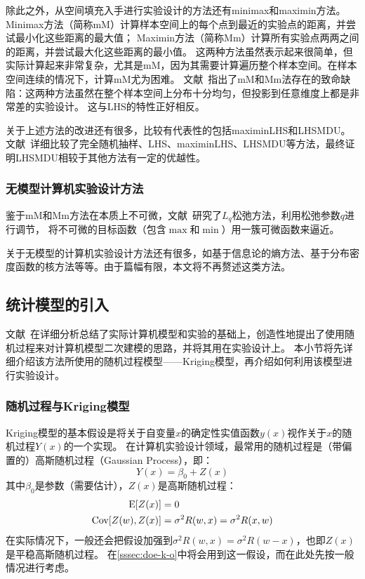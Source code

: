 \documentclass[index]{subfiles}
\begin{document}
除此之外，从空间填充入手进行实验设计的方法还有minimax和maximin方法\cite{johnson1990}。
Minimax方法（简称mM）计算样本空间上的每个点到最近的实验点的距离，并尝试最小化这些距离的最大值；
Maximin方法（简称Mm）计算所有实验点两两之间的距离，并尝试最大化这些距离的最小值。
这两种方法虽然表示起来很简单，但实际计算起来非常复杂，尤其是mM，因为其需要计算遍历整个样本空间。在样本空间连续的情况下，计算mM尤为困难。
文献~指出了mM和Mm法存在的致命缺陷：这两种方法虽然在整个样本空间上分布十分均匀，但投影到任意维度上都是非常差的实验设计。
这与LHS的特性正好相反。

关于上述方法的改进还有很多，比较有代表性的包括maximinLHS\cite{vandam2007}和LHSMDU\cite{deutsch2012}。
文献~详细比较了完全随机抽样、LHS、maximinLHS、LHSMDU等方法，最终证明LHSMDU相较于其他方法有一定的优越性。

\subsubsection{无模型计算机实验设计方法}
鉴于mM和Mm方法在本质上不可微，文献~研究了$L_q$松弛方法，利用松弛参数$q$进行调节，
将不可微的目标函数（包含$\max$和$\min$）用一簇可微函数来逼近。

关于无模型的计算机实验设计方法还有很多，如基于信息论的熵方法、基于分布密度函数的核方法等等\cite{pronzato2012}。由于篇幅有限，本文将不再赘述这类方法。

\subsection{统计模型的引入}\label{ssec:doe-gp}
文献~在详细分析总结了实际计算机模型和实验的基础上，创造性地提出了使用随机过程来对计算机模型二次建模的思路，并将其用在实验设计上。
本小节将先详细介绍该方法所使用的随机过程模型——Kriging模型，再介绍如何利用该模型进行实验设计。

\subsubsection{随机过程与Kriging模型}\label{sssec:doe-kriging}
Kriging模型的基本假设是将关于自变量$x$的确定性实值函数$y(x)$视作关于$x$的随机过程$Y(x)$的一个实现。
在计算机实验设计领域，最常用的随机过程是（带偏置的）高斯随机过程（Gaussian Process），即：
\begin{equation}\label{equ:doe-kriging}
  Y(x) = \beta_0 + Z(x)
\end{equation}
其中$\beta_0$是参数（需要估计），$Z(x)$是高斯随机过程：
\begin{align}\label{equ:doe-gp}
  \E{Z(x)} &= 0 \\
  \Cov{Z(w)}{Z(x)} &= \sigma^2 R(w, x) = \sigma^2 R(x, w)
\end{align}
在实际情况下，一般还会把假设加强到$\sigma^2 R(w, x) = \sigma^2 R(w - x)$，也即$Z(x)$是平稳高斯随机过程。
在\cref{sssec:doe-k-o}中将会用到这一假设，而在此处先按一般情况进行考虑。
\end{document}
